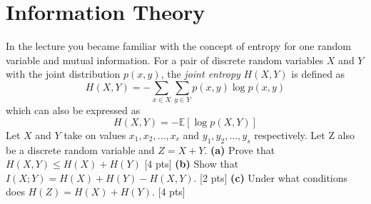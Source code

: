 \documentclass[twoside,10pt]{article}
\begin{document}
\section{Information Theory}
In the lecture you became familiar with the concept of entropy for one random variable and mutual information. For a pair of discrete random variables $X$ and $Y$ with the joint distribution $p(x,y)$, the \emph{joint entropy} $H(X,Y)$ is defined as
\begin{equation}
H(X,Y)=-\sum_{x\in X}\sum_{y\in Y}{p(x,y)\log p(x,y)}
\end{equation}
which can also be expressed as
\begin{equation}
H(X,Y)=-\mathbb{E}[\log p(X,Y)]
\end{equation}
Let $X$ and $Y$ take on values $x_1,x_2,...,x_r$ and $y_1,y_2,...,y_s$ respectively. Let Z also be a discrete random variable and $Z=X+Y$.
\newline
\newline
\textbf{(a)} Prove that $H(X,Y)\leq H(X)+H(Y)$ [4 pts] \newline\newline
\textbf{(b)} Show that $I(X;Y)=H(X)+H(Y)-H(X,Y)$. [2 pts] \newline\newline
\textbf{(c)} Under what conditions does $H(Z)=H(X)+H(Y)$. [4 pts] 
\end{document}

